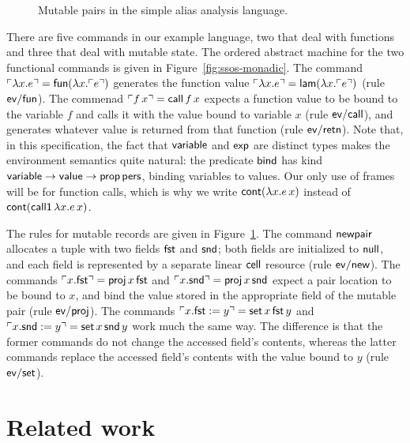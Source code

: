 \begin{figure}
\caption{Mutable pairs in the simple alias analysis language.}
\label{fig:ssos-monadic2}
\end{figure}

There are five commands in our example language, two that deal with
functions and three that deal with mutable state. The ordered abstract
machine for the two functional commands is given in
Figure~\ref{fig:ssos-monadic}. The command ${\ulcorner{\lambda x.e}\urcorner} =
{\sf fun}(\lambda x.{\ulcorner{e}\urcorner})$ generates the function value
${\ulcorner{\lambda x.e}\urcorner} = {\sf lam}(\lambda x.{\ulcorner{e}\urcorner})$ (rule ${\sf
  ev/fun}$). The commenad ${\ulcorner{f\,x}\urcorner} = {\sf call}\,f\,x$ expects a
function value to be bound to the variable $f$ and calls it with the
value bound to variable $x$ (rule ${\sf ev/call}$), and generates
whatever value is returned from that function (rule ${\sf ev/retn}$).
Note that, in this specification, the fact that ${\sf variable}$ and
${\sf exp}$ are distinct types makes the environment semantics quite
natural: the predicate ${\sf bind}$ has kind ${\sf variable}
\rightarrow {\sf value} \rightarrow {\sf prop}\,{\sf pers}$, binding
variables to values. Our only use of frames will be for function
calls, which is why we write ${\sf cont}(\lambda x.e\,x)$ instead of
${\sf cont}({\sf call1}\,\lambda x.e\,x)$.


The rules for mutable records are given in
Figure~\ref{fig:ssos-monadic2}.  The command ${\sf newpair}$ allocates
a tuple with two fields ${\sf fst}$ and ${\sf snd}$; both fields are
initialized to ${\sf null}$, and each field is represented by a
separate linear ${\sf cell}$ resource (rule ${\sf ev/new}$). The
commands ${\ulcorner{x.{\sf fst}}\urcorner} = {\sf proj}\,x\,{\sf fst}$ and
${\ulcorner{x.{\sf snd}}\urcorner} = {\sf proj}\,x\,{\sf snd}$ expect a pair
location to be bound to $x$, and bind the value stored in the
appropriate field of the mutable pair (rule ${\sf ev/proj}$). The
commands ${\ulcorner{x.{\sf fst} := y}\urcorner} = {\sf set}\,x\,{\sf fst}\,y$ and
${\ulcorner{x.{\sf snd} := y}\urcorner} = {\sf set}\,x\,{\sf snd}\,y$ work much the
same way. The difference is that the former commands do not change the
accessed field's contents, whereas the latter commands replace the
accessed field's contents with the value bound to $y$ (rule ${\sf ev/set}$). 



\section{Related work}
